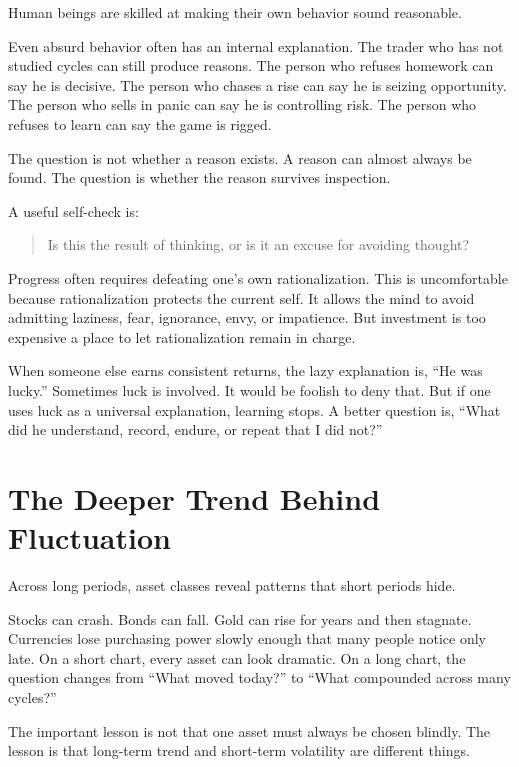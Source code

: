 Human beings are skilled at making their own behavior sound reasonable.

Even absurd behavior often has an internal explanation. The trader who has not studied cycles can still produce reasons. The person who refuses homework can say he is decisive. The person who chases a rise can say he is seizing opportunity. The person who sells in panic can say he is controlling risk. The person who refuses to learn can say the game is rigged.

The question is not whether a reason exists. A reason can almost always be found. The question is whether the reason survives inspection.

A useful self-check is:

\begin{quote}
Is this the result of thinking, or is it an excuse for avoiding thought?
\end{quote}

Progress often requires defeating one's own rationalization. This is uncomfortable because rationalization protects the current self. It allows the mind to avoid admitting laziness, fear, ignorance, envy, or impatience. But investment is too expensive a place to let rationalization remain in charge.

When someone else earns consistent returns, the lazy explanation is, ``He was lucky.'' Sometimes luck is involved. It would be foolish to deny that. But if one uses luck as a universal explanation, learning stops. A better question is, ``What did he understand, record, endure, or repeat that I did not?''

\section*{The Deeper Trend Behind Fluctuation}

Across long periods, asset classes reveal patterns that short periods hide.

Stocks can crash. Bonds can fall. Gold can rise for years and then stagnate. Currencies lose purchasing power slowly enough that many people notice only late. On a short chart, every asset can look dramatic. On a long chart, the question changes from ``What moved today?'' to ``What compounded across many cycles?''

The important lesson is not that one asset must always be chosen blindly. The lesson is that long-term trend and short-term volatility are different things.

